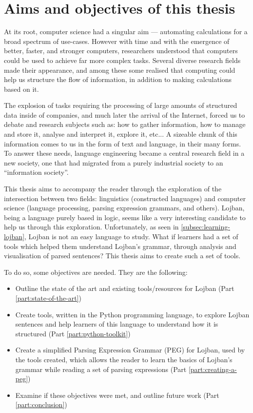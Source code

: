 \chapter{Aims and objectives of this thesis}
\label{chap:aims-and-objectives}

\vspace{0.5cm}

At its root, computer science had a singular aim --- automating calculations for a broad spectrum of use-cases.
However with time and with the emergence of better, faster, and stronger computers, researchers understood that computers could be used to achieve
far more complex tasks. Several diverse research fields made their appearance, and among these some realised that computing could help us structure the
flow of information, in addition to making calculations based on it. \newline

The explosion of tasks requiring the processing of large amounts of structured data inside of companies, and much later the arrival of the Internet,
forced us to debate and research subjects such as: how to gather information, how to manage and store it, analyse and interpret it, explore it, etc...
A sizeable chunk of this information comes to us in the form of text and language, in their many forms. To answer these needs, language engineering became a
central research field in a new society, one that had migrated from a purely industrial society to an ``information society''.\newline

This thesis aims to accompany the reader through the exploration of the intersection between two fields: linguistics (constructed languages)
and computer science (language processing, parsing expression grammars, and others). Lojban, being a language purely based in logic, seems like a very
interesting candidate to help us through this exploration. Unfortunately, as seen in \ref{subsec:learning-lojban}, Lojban is not an easy language to study.
What if learners had a set of tools which helped them understand Lojban's grammar, through analysis and visualisation of parsed sentences?
This thesis aims to create such a set of tools.\newline

\newpage

To do so, some objectives are needed. They are the following:
\begin{itemize}
\item Outline the state of the art and existing tools/resources for Lojban (Part \ref{part:state-of-the-art})
\item Create tools, written in the Python programming language, to explore Lojban sentences and help learners of this
language to understand how it is structured (Part \ref{part:python-toolkit})
\item Create a simplified Parsing Expression Grammar (PEG) for Lojban, used by the tools created,
which allows the reader to learn the basics of Lojban's grammar while reading a set of parsing expressions (Part \ref{part:creating-a-peg})
\item Examine if these objectives were met, and outline future work (Part \ref{part:conclusion})
\end{itemize}
